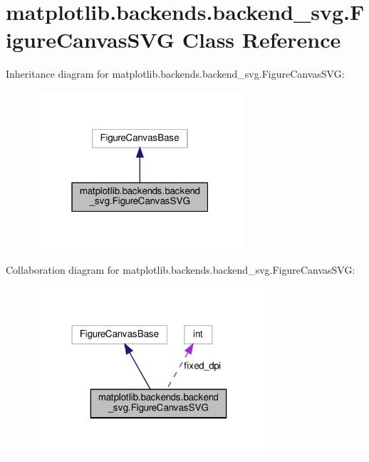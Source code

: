 \hypertarget{classmatplotlib_1_1backends_1_1backend__svg_1_1FigureCanvasSVG}{}\section{matplotlib.\+backends.\+backend\+\_\+svg.\+Figure\+Canvas\+S\+VG Class Reference}
\label{classmatplotlib_1_1backends_1_1backend__svg_1_1FigureCanvasSVG}


Inheritance diagram for matplotlib.\+backends.\+backend\+\_\+svg.\+Figure\+Canvas\+S\+VG\+:
\nopagebreak
\begin{figure}[H]
\begin{center}
\leavevmode
\includegraphics[width=223pt]{classmatplotlib_1_1backends_1_1backend__svg_1_1FigureCanvasSVG__inherit__graph}
\end{center}
\end{figure}


Collaboration diagram for matplotlib.\+backends.\+backend\+\_\+svg.\+Figure\+Canvas\+S\+VG\+:
\nopagebreak
\begin{figure}[H]
\begin{center}
\leavevmode
\includegraphics[width=243pt]{classmatplotlib_1_1backends_1_1backend__svg_1_1FigureCanvasSVG__coll__graph}
\end{center}
\end{figure}
